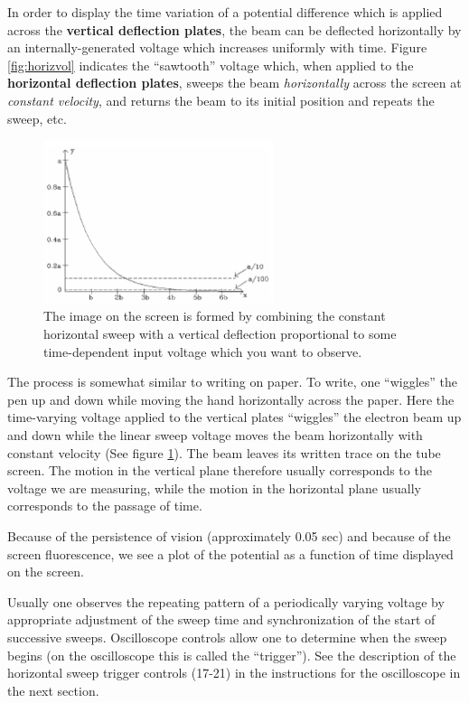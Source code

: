 In order to display the time variation of a potential difference which is applied across the \textbf{vertical deflection plates}, the beam can be deflected horizontally by an internally-generated voltage which increases uniformly with time. Figure \ref{fig:horizvol} indicates the ``sawtooth'' voltage which, when applied to the \textbf{horizontal deflection plates}, sweeps the beam \emph{horizontally} across the screen at \emph{constant velocity}, and returns the beam to its initial position and repeats the sweep, etc. \myskip

\begin{figure}[h]
    \begin{center}
        \includegraphics[width=0.6\textwidth]{./Exp3/pic/image4.png}
    \end{center}
    \caption{The image on the screen is formed by combining the constant horizontal sweep with a vertical deflection proportional to some time-dependent input voltage which you want to observe.}
    \label{fig:vertsweep}
\end{figure}

The process is somewhat similar to writing on paper. To write, one ``wiggles'' the pen up and down while moving the hand horizontally across the paper. Here the time-varying voltage applied to the vertical plates ``wiggles'' the electron beam up and down while the linear sweep voltage moves the beam horizontally with constant velocity (See figure \ref{fig:vertsweep}). The beam leaves its written trace on the tube screen. The motion in the vertical plane therefore usually corresponds to the voltage we are measuring, while the motion in the horizontal plane usually corresponds to the passage of time. \myskip

Because of the persistence of vision (approximately 0.05 sec) and because of the screen fluorescence, we see a plot of the potential as a function of time displayed on the screen.  \myskip

Usually one observes the repeating pattern of a periodically varying voltage by appropriate adjustment of the sweep time and synchronization of the start of successive sweeps. Oscilloscope controls allow one to determine when the sweep begins (on the oscilloscope this is called the ``trigger''). See the description of the horizontal sweep trigger controls (17-21) in the instructions for the oscilloscope in the next section.

